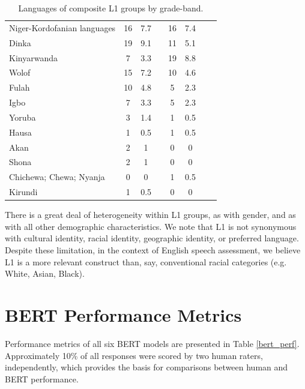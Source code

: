 \documentclass [PhD] {uclathes}
\begin{document}
\begin{table}[htbp]
\begin{tabular}{lccccccc}
\hspace{3mm} Niger-Kordofanian languages & 16 & 7.7 & & 16 & 7.4 \\
\hspace{3mm} Dinka & 19 & 9.1 & & 11 & 5.1 \\
\hspace{3mm} Kinyarwanda & 7 & 3.3 & & 19 & 8.8 \\
\hspace{3mm} Wolof & 15 & 7.2 & & 10 & 4.6 \\
\hspace{3mm} Fulah & 10 & 4.8 & & 5 & 2.3 \\
\hspace{3mm} Igbo & 7 & 3.3 & & 5 & 2.3 \\
\hspace{3mm} Yoruba & 3 & 1.4 & & 1 & 0.5 \\
\hspace{3mm} Hausa & 1 & 0.5 & & 1 & 0.5 \\
\hspace{3mm} Akan & 2 & 1 & & 0 & 0 \\
\hspace{3mm} Shona & 2 & 1 & & 0 & 0 \\
\hspace{3mm} Chichewa; Chewa; Nyanja & 0 & 0 & & 1 & 0.5 \\
\hspace{3mm} Kirundi & 1 & 0.5 & & 0 & 0 \\
    \bottomrule
    \end{tabular}
\caption{\label{lang_grp}
Languages of composite L1 groups by grade-band.}
\end{table}

There is a great deal of heterogeneity within L1 groups, as with gender, and as with all other demographic characteristics. We note that L1 is not synonymous with cultural identity, racial identity, geographic identity, or preferred language. Despite these limitation, in the context of English speech assessment, we believe L1 is a more relevant construct than, say, conventional racial categories (e.g. White, Asian, Black). 

\section{BERT Performance Metrics}
\label{sec:appendix_perf}

Performance metrics of all six BERT models are presented in Table \ref{bert_perf}. Approximately 10\% of all responses were scored by two human raters, independently, which provides the basis for comparisons between human and BERT performance. 
\end{document}

